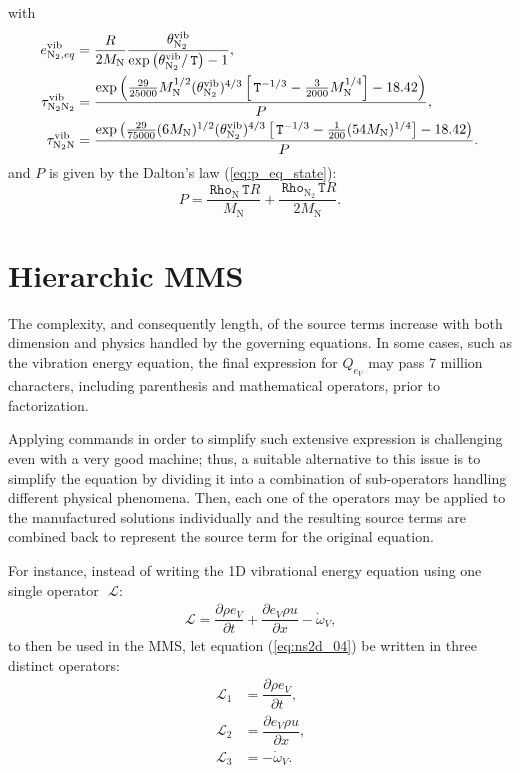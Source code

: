 \documentclass[10pt]{article}
\newcommand{\Diff}[2] {\dfrac{\partial( #1)}{\partial #2}}
\newcommand{\diff}[2] {\dfrac{\partial #1 }{\partial #2}}
\newcommand{\bv}[1]{\ensuremath{\mbox{\boldmath$ #1 $}}}
\newcommand{\Lo}{\,\mathcal{L}}
\newcommand{\Rho}{\,\mathtt{Rho}}
\newcommand{\T}{\,\mathtt{T}}
\newcommand{\N}{\text{N}}
\newcommand{\vib}{\text{vib}}
\begin{document}
with
\begin{equation}
\begin{split}
e_{\N_2, eq}^{\vib} &= \dfrac{R}{2 M_\N} \frac{\theta^{\vib}_{\N_2}}{\exp\left(\theta^{\vib}_{\N_2}/ \T \right) - 1} , \vspace{5pt}\\
\tau^{\vib}_{\N_2\N_2} &= \dfrac{ \exp\left(\frac{29}{25000} M_\N^{1/2} (\theta^{\vib}_{\N_2})^{4/3}  \left[\T^{-1/3}-\frac{3}{2000} M_\N^{1/4}\right] -18.42\right)}{P}, \vspace{5pt}\\
\tau^{\vib}_{\N_2\N} &=\dfrac{ \exp\left(\frac{29}{75000} (6 M_\N)^{1/2} (\theta^{\vib}_{\N_2})^{4/3} \left[\T^{-1/3} -\frac{1}{200} (54M_\N)^{1/4}\right]-18.42\right)}{P}.
\end{split}
\end{equation}
and $P$ is given by the Dalton's law (\ref{eq:p_eq_state}):
$$P = \dfrac{\Rho_{\N}  \T R}{M_\N}+ \dfrac{\Rho_{\N_2}  \T R}{2 M_\N}.$$




\section{Hierarchic MMS}

The complexity, and consequently length, of the source terms increase with both dimension and physics handled by the governing equations. In some cases, such as the vibration energy equation, the final expression for $Q_{e_V}$ may pass 7 million characters, including parenthesis and mathematical operators, prior to factorization.

Applying commands in order to simplify such extensive expression is challenging even with a very good machine; thus, a suitable alternative to this issue is to simplify the equation by dividing it into a combination of sub-operators handling different physical phenomena. Then, each one of the operators may be applied to the manufactured solutions individually and the resulting source terms are combined back to represent the source term for the original equation.


For instance, instead of writing the 1D vibrational energy equation using one single operator~$\Lo$:
\begin{equation}
 \label{eq:ns2d_04}
\begin{split}
\Lo= \diff{\rho e_V}{t}+\diff{e_V \rho u }{x} -\dot{\omega}_V ,
\end{split}
\end{equation}
to then be used in the MMS, let equation (\ref{eq:ns2d_04}) be written in three distinct operators:
\begin{equation*}
 \begin{split}
  \Lo_1&=\diff{\rho e_V}{t} ,\\
  \Lo_2&=\diff{e_V \rho u }{x},\\
  \Lo_3&= -\dot{\omega}_V.\\
   \end{split}
\end{equation*}
\end{document}
